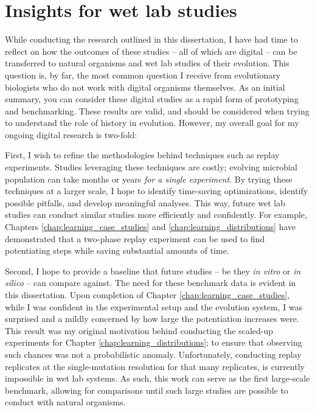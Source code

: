 \section{Insights for wet lab studies}

While conducting the research outlined in this dissertation, I have had time to reflect on how the outcomes of these studies -- all of which are digital -- can be transferred to natural organisms and wet lab studies of their evolution. 
This question is, by far, the most common question I receive from evolutionary biologists who do not work with digital organisms themselves. 
As an initial summary, you can consider these digital studies as a rapid form of prototyping and benchmarking. 
These results are valid, and should be considered when trying to understand the role of history in evolution. 
However, my overall goal for my ongoing digital research is two-fold:

First, I wish to refine the methodologies behind techniques such as replay experiments. 
Studies leveraging these techniques are costly; evolving microbial population can take months or years \textit{for a single experiment}. 
By trying these techniques at a larger scale, I hope to identify time-saving optimizations, identify possible pitfalls, and develop meaningful analyses. 
This way, future wet lab studies can conduct similar studies more efficiently and confidently. 
For example, Chapters \ref{chap:learning_case_studies} and \ref{chap:learning_distributions} have demonstrated that a two-phase replay experiment can be used to find potentiating steps while saving substantial amounts of time. 

Second, I hope to provide a baseline that future studies -- be they \textit{in vitro} or \textit{in silico} -- can compare against. 
The need for these benchmark data is evident in this dissertation. 
Upon completion of Chapter \ref{chap:learning_case_studies}, while I was confident in the experimental setup and the evolution system, I was surprised and a mildly concerned by how large the potentiation increases were. 
This result was my original motivation behind conducting the scaled-up experiments for Chapter \ref{chap:learning_distributions}; to ensure that observing such chances was not a probabilistic anomaly. 
Unfortunately, conducting replay replicates at the single-mutation resolution for that many replicates, is currently impossible in wet lab systems. 
As such, this work can serve as the first large-scale benchmark, allowing for comparisons until such large studies are possible to conduct with natural organisms.

